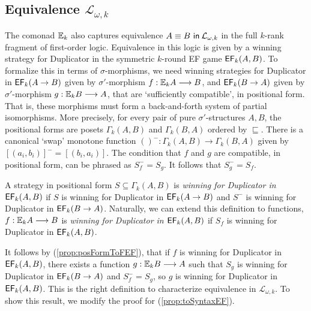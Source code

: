 \subsection{Equivalence $\mathcal{L}_{\omega,k}$}
The comonad ${\mathbb{E}_{k}}$ also captures equivalence ${A \equiv B \ \mathsf{in}\: \mathcal{L}_{\omega,k}}$ in the full $k$-rank fragment of first-order logic. Equivalence in this logic is given by a winning strategy for Duplicator in the symmetric $k$-round EF game ${\mathsf{EF}_{k}(A,B)}$. To formalize this in terms of $\sigma$-morphisms, we need winning strategies for Duplicator in ${\mathsf{EF}_{k}(A \rightarrow B)}$ given by $\sigma'$-morphism $f:{\mathbb{E}_{k}A} \longrightarrow B$, and ${\mathsf{EF}_{k}(B \rightarrow A)}$ given by $\sigma'$-morphism $g:{\mathbb{E}_{k}B} \longrightarrow A$, that are `sufficiently compatible', in positional form.  That is, these morphisms must form a back-and-forth system of partial isomorphisms. More precisely, for every pair of pure $\sigma'$-structures $A,B$, the positional forms are posets $\Gamma_{k}(A,B)$ and $\Gamma_{k}(B,A)$ ordered by $\sqsubseteq$. There is a canonical `swap' monotone function $()^{-}:\Gamma_{k}(A,B) \longrightarrow \Gamma_{k}(B,A)$ given by $[(a_{i},b_{i})]^{-} = [(b_{i},a_{i})]$. The condition that $f$ and $g$ are compatible, in positional form, can be phrased as $S_{f}^{-} = S_{g}$. It follows that $S_{g}^{-} = S_{f}$. 
\begin{defn}
A strategy in positional form $S \subseteq \Gamma_{k}(A,B)$ is \textit{winning for Duplicator in ${\mathsf{EF}_{k}(A,B)}$} if $S$ is winning for Duplicator in ${\mathsf{EF}_{k}(A \rightarrow B)}$ and $S^{-}$ is winning for Duplicator in ${\mathsf{EF}_{k}(B \rightarrow A)}$. Naturally, we can extend this definition to functions, $f:{\mathbb{E}_{k}A} \longrightarrow B$ is \textit{winning for Duplicator in ${\mathsf{EF}_{k}(A,B)}$} if $S_{f}$ is winning for Duplicator in ${\mathsf{EF}_{k}(A,B)}$.
\end{defn}
It follows by (\ref{prop:posFormToFEF}), that if $f$ is winning for Duplicator in ${\mathsf{EF}_{k}(A,B)}$, there exists a function $g:{\mathbb{E}_{k}B} \longrightarrow A$ such that $S_{g}$ is winning for Duplicator in ${\mathsf{EF}_{k}(B \rightarrow A)}$ and $S_{f}^{-} = S_{g}$, so $g$ is winning for Duplicator in ${\mathsf{EF}_{k}(A,B)}$. This is the right definition to characterize equivalence in $\mathcal{L}_{\omega,k}$. To show this result, we modify the proof for (\ref{prop:toSyntaxEF}).  
